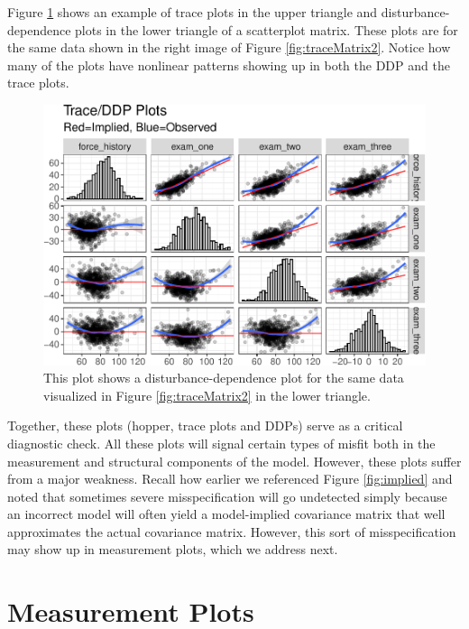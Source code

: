 \documentclass[
  english,
  doc]{apa6}
\begin{document}
Figure \ref{fig:ddp} shows an example of trace plots in the upper triangle and disturbance-dependence plots in the lower triangle of a scatterplot matrix. These plots are for the same data shown in the right image of Figure \ref{fig:traceMatrix2}. Notice how many of the plots have nonlinear patterns showing up in both the DDP and the trace plots.



\begin{figure}
\centering
\includegraphics{flexplavaan_draft_files/figure-latex/ddp-1.pdf}
\caption{\label{fig:ddp}This plot shows a disturbance-dependence plot for the same data visualized in Figure \ref{fig:traceMatrix2} in the lower triangle.}
\end{figure}

Together, these plots (hopper, trace plots and DDPs) serve as a critical diagnostic check. All these plots will signal certain types of misfit both in the measurement and structural components of the model. However, these plots suffer from a major weakness. Recall how earlier we referenced Figure \ref{fig:implied} and noted that sometimes severe misspecification will go undetected simply because an incorrect model will often yield a model-implied covariance matrix that well approximates the actual covariance matrix. However, this sort of misspecification may show up in measurement plots, which we address next.

\hypertarget{measurement-plots}{%
\section{Measurement Plots}\label{measurement-plots}}
\end{document}
